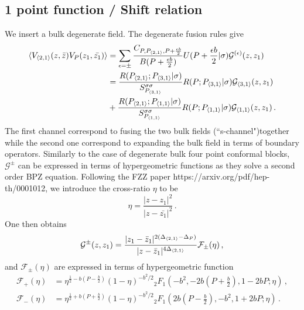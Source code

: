 \documentclass[a4paper]{article}
\begin{document}
\subsection{1 point function / Shift relation}
We insert a bulk degenerate field. The degenerate fusion rules give
\begin{equation}\label{eq:crossing}
  \begin{aligned}
    \braket{V_{\braket{2,1}}(z,\bar{z})V_{P}(z_1,\bar{z_1})}
    &=\sum_{\epsilon = \pm} \frac{C_{P,P_{\braket{2,1}},P+\frac{\epsilon b }{2}}}{B(P+\frac{\epsilon b}{2})} U(P+\frac{\epsilon b}{2}|\sigma) \mathcal{G}^{(\epsilon)}(z,z_1)\\
    &=\frac{R(P_{\braket{2,1}};P_{\braket{3,1}}|\sigma)}{S_{P_{\braket{3,1}}}^{\sigma \sigma}} R(P;P_{\braket{3,1}}|\sigma)\mathcal{G}_{\braket{3,1}}(z,z_1)\\
    &+\frac{R(P_{\braket{2,1}};P_{\braket{1,1}}|\sigma)}{S_{P_{\braket{1,1}}}^{\sigma \sigma}}R(P;P_{\braket{1,1}}|\sigma)\mathcal{G}_{\braket{1,1}}(z,z_1)\,.
  \end{aligned}
\end{equation}
The first channel correspond to fusing the two bulk fields (``s-channel")together while the second one correspond to expanding the bulk field in terms of boundary operators. Similarly to the case of degenerate bulk four point conformal blocks, $\mathcal{G}^{\pm}$ can be expressed in terms of hypergeometric functions as they solve a second order BPZ equation. Following the FZZ paper https://arxiv.org/pdf/hep-th/0001012, we introduce the cross-ratio $\eta$ to be
\begin{equation}\label{eq:cross_ratio}
  \eta = \frac{|z-z_1|^2}{|z-\bar{z_1}|^2}\,.
\end{equation}
One then obtains
\begin{equation}\label{eq:hypergeomblock}
  \begin{aligned}
    \mathcal{G}^{\pm}(z,z_1) = \frac{|z_1-\bar{z}_1|^{2(\Delta_{\braket{2,1}}-\Delta_{P})}}{|z-\bar{z}_1|^{4\Delta_{\braket{2,1}}}}\mathcal{F}_{\pm}(\eta)\,,
  \end{aligned}
\end{equation}
and $\mathcal{F}_{\pm}(\eta)$ are expressed in terms of hypergeometric function
\begin{equation}\label{eq:hypergeom}
  \begin{aligned}
    \mathcal{F}_{+}(\eta) &= \eta^{\frac{1}{2}-b\left(P-\frac{b}{2}\right)}(1-\eta)^{-b^2/2} {}_2 F_1 \left(-b^2, -2b\left(P+\frac{b}{2}\right), 1-2bP; \eta\right)\,,\\
    \mathcal{F}_{-}(\eta) &= \eta^{\frac{1}{2}+b\left(P+\frac{b}{2}\right)}(1-\eta)^{-b^2/2} {}_2 F_1 \left(2b\left(P-\frac{b}{2}\right), -b^2, 1+2bP; \eta\right)\,.
  \end{aligned}
\end{equation}
\end{document}
